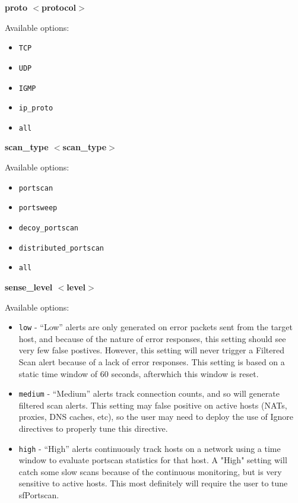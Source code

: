 \documentclass[english]{report}
\newcounter{slistnum}
\newenvironment{slist}
{ \begin{list}{ {\bf \arabic{slistnum}.} }{\usecounter{slistnum} } }
{ \end{list} }
\begin{document}
\begin{slist}
\item \textbf{proto $<$protocol$>$}

  Available options:
  \begin{itemize}
    \item \texttt{TCP}
	\item \texttt{UDP}
	\item \texttt{IGMP}
	\item \texttt{ip\_proto}
	\item \texttt{all}
   \end{itemize}

\item \textbf{scan\_type $<$scan\_type$>$}

  Available options: 
   \begin{itemize}
	\item \texttt{portscan} 
	\item \texttt{portsweep} 
	\item \texttt{decoy\_portscan}
	\item \texttt{distributed\_portscan}
	\item \texttt{all}
	\end{itemize}

\item \textbf{sense\_level $<$level$>$}

  Available options:
  \begin{itemize}
	\item \texttt{low} - ``Low'' alerts are only generated on error packets sent from the
  target host, and because of the nature of error responses, this
  setting should see very few false postives. However, this setting
  will never trigger a Filtered Scan alert because of a lack of error
  responses. This setting is based on a static time window of 60
  seconds, afterwhich this window is reset.
	\item \texttt{medium} - ``Medium'' alerts track connection counts, and so will generate
  filtered scan alerts. This setting may false positive on active
  hosts (NATs, proxies, DNS caches, etc), so the user may need to
  deploy the use of Ignore directives to properly tune this directive.
	\item \texttt{high} - ``High'' alerts continuously track hosts on a network using a time
  window to evaluate portscan statistics for that host. A "High"
  setting will catch some slow scans because of the continuous
  monitoring, but is very sensitive to active hosts. This most
  definitely will require the user to tune sfPortscan.
  \end{itemize}


\end{slist}
\end{document}
